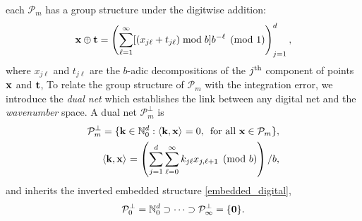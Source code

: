  each $\mathcal{P}_m$ has a group structure under the digitwise addition:
\[
\boldsymbol{\mathbf{x}} \oplus \boldsymbol{\mathbf{t}} = \left(\sum_{\ell=1}^{\infty} [(x_{j\ell} + t_{j\ell}) \bmod b] b^{-\ell} \pmod{1} \right)_{j=1}^d,
\]
where $x_{j\ell}$ and $t_{j\ell}$ are the $b$-adic decompositions of the $j^{\rm th}$ component of points $\boldsymbol{\mathbf{x}}$ and $\boldsymbol{\mathbf{t}}$, 
To relate the group structure of $\mathcal{P}_m$ with the integration error, we introduce the \emph{dual net} which establishes the link between any digital net and the \emph{wavenumber} space. A dual net $\mathcal{P}_m^\perp$ is
\begin{align*}
\mathcal{P}_m^\perp=\{\boldsymbol{\mathbf{k}}\in\mathbb{N}_0^d:\left \langle \boldsymbol{\mathbf{k}}, \boldsymbol{\mathbf{x}} \right \rangle_{{}}=0,\, \text{ for all } \boldsymbol{\mathbf{x}}\in\mathcal{P}_m\}, \\
\left \langle \boldsymbol{\mathbf{k}}, \boldsymbol{\mathbf{x}} \right \rangle_{{}} = \left(\sum_{j=1}^{d} \sum_{\ell=0}^{\infty} k_{j\ell}x_{j,\ell+1}  \pmod b \right)/b,
\end{align*}
and inherits the inverted embedded structure \eqref{embedded_digital},
\begin{equation}\label{dual_net_structure}
\mathcal{P}_0^\perp=\mathbb{N}_0^d\supset\dots\supset\mathcal{P}_\infty^\perp=\{\boldsymbol{\mathbf{0}}\}.
\end{equation}

